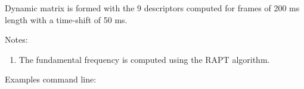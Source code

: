 \documentclass[letterpaper,10pt,english]{sphinxmanual}
\begin{document}
\begin{fulllineitems}
Dynamic matrix is formed with the 9 descriptors computed for frames of 200 ms length with a time-shift of 50 ms.

Notes:
\begin{enumerate}
\item {} 
The fundamental frequency is computed using the RAPT algorithm.

\end{enumerate}

\begin{sphinxVerbatim}[commandchars=\\\{\}]
              
\end{sphinxVerbatim}

Examples command line:


\end{fulllineitems}
\end{document}

